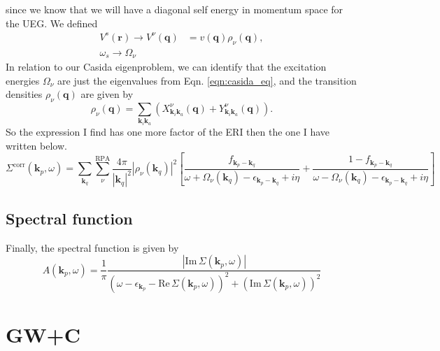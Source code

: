 since we know that we will have a diagonal self energy in momentum space for the UEG. We defined
\begin{align}
    V^s(\mathbf{r}) \rightarrow V^\nu(\mathbf{q}) &= v(\mathbf{q}) \rho_\nu(\mathbf{q}) , \\
    \omega_s \rightarrow \Omega_\nu 
\end{align}
In relation to our Casida eigenproblem, we can identify that the excitation energies $\Omega_\nu$ are just the eigenvalues from Eqn. \ref{eqn:casida_eq}, and the transition densities $\rho_\nu(\bm{q})$ are given by
\begin{equation}
    \rho_{\nu}(\bm{q}) = \sum_{\bm{k}_i \bm{k}_a} (X_{\bm{k}_i \bm{k}_a}^\nu(\bm{q}) + Y_{\bm{k}_i \bm{k}_a}^\nu(\bm{q})).
\end{equation}
So the expression I find has one more factor of the ERI then the one I have written below.
\begin{equation}
    \Sigma^{\text{corr}}(\bm{k}_p,\omega) = \sum_{\bm{k}_q}\sum_{\nu }^{\text{RPA}} \frac{4\pi}{|\bm{k}_q|^2} |\rho_\nu(\bm{k}_q)|^2 \left[ \frac{f_{\bm{k}_p - \bm{k}_q}}{\omega + \Omega_\nu(\bm{k}_q) - \epsilon_{\bm{k}_p - \bm{k}_q} + i\eta} + \frac{1 - f_{\bm{k}_p - \bm{k}_q}}{\omega - \Omega_\nu(\bm{k}_q) - \epsilon_{\bm{k}_p - \bm{k}_q} + i\eta} \right]
\end{equation}

\subsection{Spectral function}
Finally, the spectral function is given by
\begin{equation}
    A(\bm{k}_p,\omega) = \frac{1}{\pi} \frac{|\text{Im}\,\Sigma(\bm{k}_p,\omega)|}{\left(\omega - \epsilon_{\bm{k}_p} - \text{Re}\,\Sigma(\bm{k}_p,\omega)\right)^2 + \left(\text{Im}\,\Sigma(\bm{k}_p,\omega)\right)^2}
\end{equation}
\section{GW+C}
